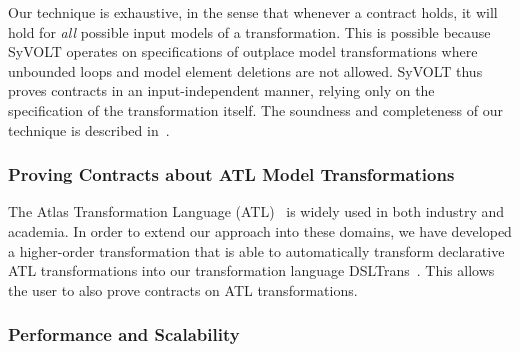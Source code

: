 Our technique is exhaustive, in the sense that whenever a contract holds, it
will hold for \emph{all} possible input models of a transformation. This is
possible because SyVOLT operates on specifications of outplace model transformations where unbounded loops and model element
deletions are not allowed. SyVOLT thus proves contracts in an input-independent
manner, relying only on the specification of the transformation itself. The
soundness and completeness of our technique is described in~\cite{Lucio2014}.

\subsubsection{Proving Contracts about ATL Model Transformations}

 The Atlas
Transformation Language (ATL)~\cite{atlTool} is widely used in both industry and
academia. In order to extend our approach into these domains, we have developed a higher-order
transformation that is able to automatically transform declarative ATL
transformations into our transformation language DSLTrans~\cite{Oakes}. This
allows the user to also prove contracts on ATL transformations.

\subsubsection{Performance and Scalability}

